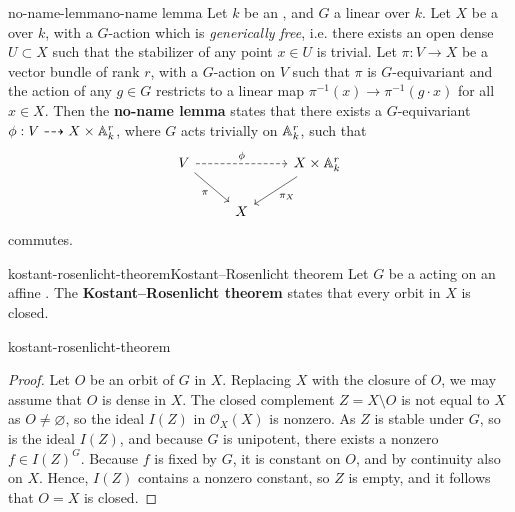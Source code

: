 \begin{topic}{no-name-lemma}{no-name lemma}
    Let $k$ be an , and $G$ a linear  over $k$. Let $X$ be a  over $k$, with a $G$-action which is \textit{generically free}, i.e. there exists an open dense $U \subset X$ such that the stabilizer of any point $x \in U$ is trivial. Let $\pi \colon V \to X$ be a vector bundle of rank $r$, with a $G$-action on $V$ such that $\pi$ is $G$-equivariant and the action of any $g \in G$ restricts to a linear map $\pi^{-1}(x) \to \pi^{-1}(g \cdot x)$ for all $x \in X$. Then the \textbf{no-name lemma} states that there exists a $G$-equivariant  $\phi : V \dashrightarrow X \times \AA^r_k$, where $G$ acts trivially on $\AA^r_k$, such that
    \[ \svg \begin{tikzcd}
        V \arrow[dashed]{rr}{\phi} \arrow[swap]{rd}{\pi} && X \times \AA^r_k \arrow{dl}{\pi_X} \\
        & X &
    \end{tikzcd} \]
    commutes.
\end{topic}

\begin{topic}{kostant-rosenlicht-theorem}{Kostant--Rosenlicht theorem}
    Let $G$ be a  acting on an affine . The \textbf{Kostant--Rosenlicht theorem} states that every orbit in $X$ is closed.
\end{topic}

\begin{example}{kostant-rosenlicht-theorem}
    \begin{proof}
        Let $O$ be an orbit of $G$ in $X$. Replacing $X$ with the closure of $O$, we may assume that $O$ is dense in $X$. The closed complement $Z = X \setminus O$ is not equal to $X$ as $O \ne \varnothing$, so the ideal $I(Z)$ in $\mathcal{O}_X(X)$ is nonzero. As $Z$ is stable under $G$, so is the ideal $I(Z)$, and because $G$ is unipotent, there exists a nonzero $f \in I(Z)^G$. Because $f$ is fixed by $G$, it is constant on $O$, and by continuity also on $X$. Hence, $I(Z)$ contains a nonzero constant, so $Z$ is empty, and it follows that $O = X$ is closed.
    \end{proof}
\end{example}

